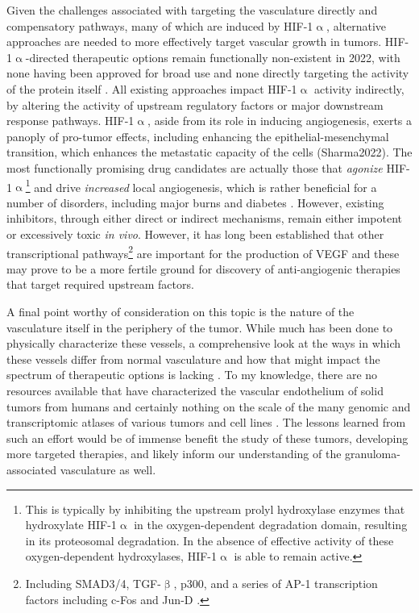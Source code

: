 Given the challenges associated with targeting the vasculature directly and compensatory pathways, many of which are induced by HIF\hyp{}1$\upalpha$, alternative approaches are needed to more effectively target vascular growth in tumors. HIF\hyp{}1$\upalpha$\hyp{}directed therapeutic options remain functionally non\hyp{}existent in 2022, with none having been approved for broad use and none directly targeting the activity of the protein itself \citep{Sharma2022}. All existing approaches impact HIF\hyp{}1$\upalpha$ activity indirectly, by altering the activity of upstream regulatory factors or major downstream response pathways. HIF\hyp{}1$\upalpha$, aside from its role in inducing angiogenesis, exerts a panoply of pro\hyp{}tumor effects, including enhancing the epithelial\hyp{}mesenchymal transition, which enhances the metastatic capacity of the cells (Sharma2022). The most functionally promising drug candidates are actually those that \textit{agonize} HIF\hyp{}1$\upalpha$\footnote{This is typically by inhibiting the upstream prolyl hydroxylase enzymes that hydroxylate HIF\hyp{}1$\upalpha$ in the oxygen\hyp{}dependent degradation domain, resulting in its proteosomal degradation. In the absence of effective activity of these oxygen\hyp{}dependent hydroxylases, HIF\hyp{}1$\upalpha$ is able to remain active.} and drive \textit{increased} local angiogenesis, which is rather beneficial for a number of disorders, including major burns and diabetes \citep{Dor2002, DeRosa2018, Atluri2008}. However, existing inhibitors, through either direct or indirect mechanisms, remain either impotent or excessively toxic \textit{in vivo}. However, it has long been established that other transcriptional pathways\footnote{Including SMAD3/4, TGF\hyp{}$\upbeta$, p300, and a series of AP\hyp{}1 transcription factors including c\hyp{}Fos and Jun\hyp{}D \citep{Jeon2006, Nam2010, Gray2005, Kwon2012, Thangarajah2009, Marconcini1999, Schmidt2007, Catar2013, Yoshitomi2021}.} are important for the production of VEGF and these may prove to be a more fertile ground for discovery of anti\hyp{}angiogenic therapies that target required upstream factors.

A final point worthy of consideration on this topic is the nature of the vasculature itself in the periphery of the tumor. While much has been done to physically characterize these vessels, a comprehensive look at the ways in which these vessels differ from normal vasculature and how that might impact the spectrum of therapeutic options is lacking \citep{Jambusaria2020}. To my knowledge, there are no resources available that have characterized the vascular endothelium of solid tumors from humans and certainly nothing on the scale of the many genomic and transcriptomic atlases of various tumors and cell lines \citep{Kahn2021}. The lessons learned from such an effort would be of immense benefit the study of these tumors, developing more targeted therapies, and likely inform our understanding of the granuloma\hyp{}associated vasculature as well.

